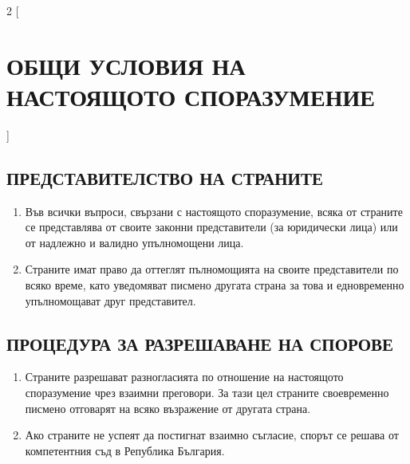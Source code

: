 \begin{multicols}{2} [\section{ОБЩИ УСЛОВИЯ НА НАСТОЯЩОТО
    СПОРАЗУМЕНИЕ}]
  \subsection{ПРЕДСТАВИТЕЛСТВО НА СТРАНИТЕ}
  \begin{enumerate}
  \item Във всички въпроси, свързани с настоящото споразумение, всяка
    от страните се представлява от своите законни представители (за
    юридически лица) или от надлежно и валидно упълномощени лица.
  \item Страните имат право да оттеглят пълномощията на своите
    представители по всяко време, като уведомяват писмено другата
    страна за това и едновременно упълномощават друг представител.
  \end{enumerate}

  \subsection{ПРОЦЕДУРА ЗА РАЗРЕШАВАНЕ НА СПОРОВЕ}
  \begin{enumerate}
  \item Страните разрешават разногласията по отношение на настоящото
    споразумение чрез взаимни преговори. За тази цел страните
    своевременно писмено отговарят на всяко възражение от другата
    страна.
  \item Ако страните не успеят да постигнат взаимно съгласие, спорът
    се решава от компетентния съд в Република България.
  \end{enumerate}


\end{multicols}
